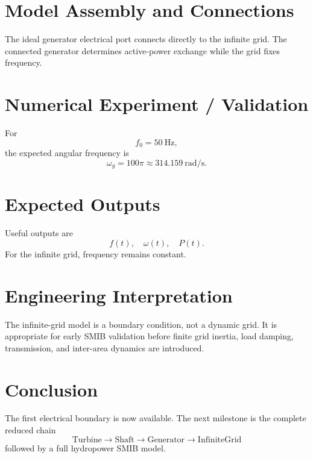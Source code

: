 \documentclass[11pt,a4paper]{article}
\begin{document}
\section{Model Assembly and Connections}
The ideal generator electrical port connects directly to the infinite grid. The connected generator determines active-power exchange while the grid fixes frequency.

\section{Numerical Experiment / Validation}
For
\[
f_0=50~\si{\hertz},
\]
the expected angular frequency is
\[
\boxed{\omega_g=100\pi\approx314.159~\si{\radian\per\second}}.
\]

\section{Expected Outputs}
Useful outputs are
\[
f(t),\quad\omega(t),\quad P(t).
\]
For the infinite grid, frequency remains constant.

\section{Engineering Interpretation}
The infinite-grid model is a boundary condition, not a dynamic grid. It is appropriate for early SMIB validation before finite grid inertia, load damping, transmission, and inter-area dynamics are introduced.

\section*{Conclusion}
The first electrical boundary is now available. The next milestone is the complete reduced chain
\[
\boxed{\text{Turbine}\rightarrow\text{Shaft}\rightarrow\text{Generator}\rightarrow\text{InfiniteGrid}}
\]
followed by a full hydropower SMIB model.
\end{document}
